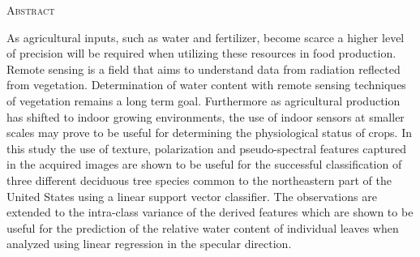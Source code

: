 \begin{center}
  \textsc{Abstract}
\end{center}
%
\noindent
%
As agricultural inputs, such as water and fertilizer, become scarce a higher level of precision will be required when utilizing these resources in food production. Remote sensing is a field that aims to understand data from radiation reflected from vegetation.  Determination of water content with remote sensing techniques
of vegetation remains a long term goal.  Furthermore as agricultural production has shifted to indoor
growing environments, the use of indoor sensors at smaller scales may prove to be useful for determining the
physiological status of crops. In this study the use of texture, polarization and pseudo-spectral features captured in
the acquired images are shown to be useful for the successful classification of
three different deciduous tree species common to the northeastern part of the
United States using a linear support vector classifier. The observations
are extended to the intra-class variance of the derived features which are shown
to be useful for the prediction of the relative water content of individual leaves when
analyzed using linear regression in the specular direction.
